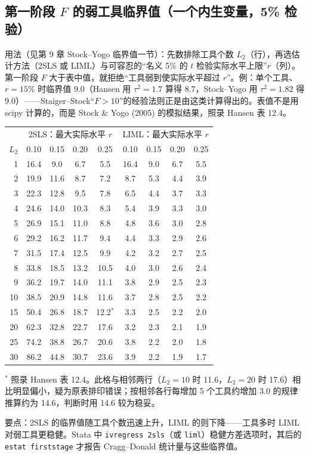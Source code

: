 \subsection{第一阶段 \texorpdfstring{$F$}{F} 的弱工具临界值（一个内生变量，5\% 检验）}
用法（见第 9 章 Stock--Yogo 临界值一节）：先数排除工具个数 $L_2$（行），再选估计方法（2SLS 或 LIML）与可容忍的“名义 5\% 的 $t$ 检验实际水平上限”$r$（列）。第一阶段 $F$ 大于表中值，就拒绝“工具弱到使实际水平超过 $r$”。例：单个工具、$r=15\%$ 时临界值 9.0（Hansen 用 $\tau^2=1.7$ 算得 8.7，Stock--Yogo 用 $\tau^2=1.82$ 得 9.0）——Staiger--Stock“$F>10$”的经验法则正是由这类计算得出的。表值不是用 scipy 计算的，而是 Stock \& Yogo (2005) 的模拟结果，照录 Hansen 表 12.4。
\begin{center}\small\setlength{\tabcolsep}{5pt}\label{tab:sy}
\begin{tabular}{r|cccc|cccc}\toprule
& \multicolumn{4}{c|}{2SLS：最大实际水平 $r$} & \multicolumn{4}{c}{LIML：最大实际水平 $r$}\\
$L_2$ & 0.10 & 0.15 & 0.20 & 0.25 & 0.10 & 0.15 & 0.20 & 0.25\\\midrule
1 & 16.4 & 9.0 & 6.7 & 5.5 & 16.4 & 9.0 & 6.7 & 5.5\\
2 & 19.9 & 11.6 & 8.7 & 7.2 & 8.7 & 5.3 & 4.4 & 3.9\\
3 & 22.3 & 12.8 & 9.5 & 7.8 & 6.5 & 4.4 & 3.7 & 3.3\\
4 & 24.6 & 14.0 & 10.3 & 8.3 & 5.4 & 3.9 & 3.3 & 3.0\\
5 & 26.9 & 15.1 & 11.0 & 8.8 & 4.8 & 3.6 & 3.0 & 2.8\\
6 & 29.2 & 16.2 & 11.7 & 9.4 & 4.4 & 3.3 & 2.9 & 2.6\\
7 & 31.5 & 17.4 & 12.5 & 9.9 & 4.2 & 3.2 & 2.7 & 2.5\\
8 & 33.8 & 18.5 & 13.2 & 10.5 & 4.0 & 3.0 & 2.6 & 2.4\\
9 & 36.2 & 19.7 & 14.0 & 11.1 & 3.8 & 2.9 & 2.5 & 2.3\\
10 & 38.5 & 20.9 & 14.8 & 11.6 & 3.7 & 2.8 & 2.5 & 2.2\\
15 & 50.4 & 26.8 & 18.7 & 12.2$^{*}$ & 3.3 & 2.5 & 2.2 & 2.0\\
20 & 62.3 & 32.8 & 22.7 & 17.6 & 3.2 & 2.3 & 2.1 & 1.9\\
25 & 74.2 & 38.8 & 26.7 & 20.6 & 3.8 & 2.2 & 2.0 & 1.8\\
30 & 86.2 & 44.8 & 30.7 & 23.6 & 3.9 & 2.2 & 1.9 & 1.7\\
\bottomrule\end{tabular}\end{center}
{\small $^{*}$ 照录 Hansen 表 12.4。此格与相邻两行（$L_2=10$ 时 11.6，$L_2=20$ 时 17.6）相比明显偏小，疑为原表排印错误；按相邻各行每增加 5 个工具约增加 3.0 的规律推算约为 14.6，判断时用 14.6 较为稳妥。}

要点：2SLS 的临界值随工具个数迅速上升，LIML 的则下降——工具多时 LIML 对弱工具更稳健。Stata 中 \texttt{ivregress 2sls}（或 \texttt{liml}）稳健方差选项时，其后的 \texttt{estat firststage} 才报告 Cragg--Donald 统计量与这些临界值。
